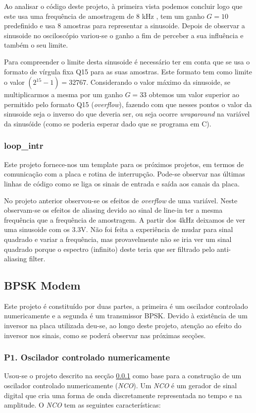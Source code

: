 \documentclass[11pt]{article}
\numberwithin{equation}{section}
\begin{document}
Ao analisar o código deste projeto, à primeira vista podemos concluir logo que este usa uma frequência de amostragem de 8 kHz , tem um ganho $G=10$ predefinido e usa 8 amostras para representar a sinusoide. Depois de observar a sinusoide no osciloscópio variou-se o ganho a fim de perceber a sua influência e também o seu limite.
 
Para compreender o limite desta sinusoide é necessário ter em conta que se usa o formato de vírgula fixa Q15 para as suas amostras. Este formato tem como limite o valor $(2^{15}-1) = 32767$. Considerando o valor máximo da sinusoide, se multiplicarmos a mesma por um ganho $G=33$ obtemos um valor superior ao permitido pelo formato Q15 (\textit{overflow}), fazendo com que nesses pontos o valor da sinusoide seja o inverso do que deveria ser, ou seja ocorre \textit{wraparound} na variável da sinusóide (como se poderia esperar dado que se programa em C).   

\subsubsection{loop\_intr}
\label{sec:loop}
Este projeto fornece-nos um template para os próximos projetos, em termos de comunicação com a placa e rotina de interrupção. Pode-se observar nas últimas linhas de código como se liga os sinais de entrada e saída aos canais da placa.
                                         
No projeto anterior observou-se os efeitos de \textit{overflow} de uma variável. Neste observam-se os efeitos de aliasing  devido ao sinal de line-in ter a mesma frequência que a frequência de amostragem. A partir dos 4kHz deixamos de ver uma sinusoide com os 3.3V. Não foi feita a experiência de mudar para sinal quadrado e variar a frequência, mas provavelmente não se iria ver um sinal quadrado porque o espectro (infinito) deste teria que ser filtrado pelo anti-aliasing filter. 

\subsection{BPSK Modem}
Este projeto é constituído por duas partes, a primeira é um oscilador controlado numericamente e a segunda é um transmissor BPSK. Devido à existência de um inversor na placa utilizada deu-se, ao longo deste projeto, atenção ao efeito do inversor nos sinais, como se poderá observar nas próximas secções.

\subsubsection{P1. Oscilador controlado numericamente}
\label{NCO}
Usou-se o projeto descrito na secção \ref{sec:loop} como base para a construção de um oscilador controlado numericamente (\textit{NCO}). Um \textit{NCO} é um gerador de sinal digital que cria uma forma de onda discretamente representada no tempo e na amplitude. O \textit{NCO} tem as seguintes características:
\end{document}
